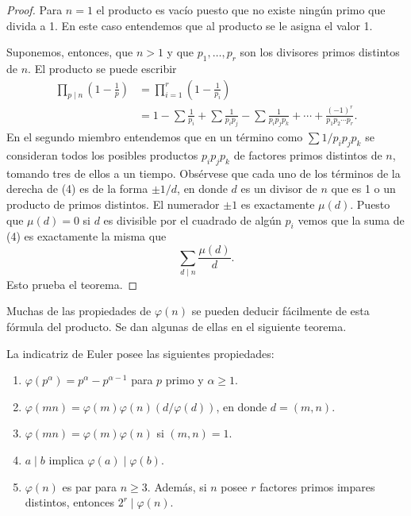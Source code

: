 \documentclass[12pt,a4paper]{book}
\begin{document}
    \begin{proof}
        Para $n=1$ el producto es vacío puesto que no existe ningún primo que divida a 1.
        En este caso entendemos que al producto se le asigna el valor 1.

        Suponemos, entonces, que $n>1$ y que $p_{1},\dots,p_{r}$ son los divisores primos
        distintos de $n$. El producto se puede escribir
        \begin{align}
            \prod_{p\mid n}\left(1-\frac{1}{p}\right)&=\prod_{i=1}^{r}\left(1-\frac{1}{p_{i}}\right)\\
            &=1-\sum\frac{1}{p_{i}}+\sum\frac{1}{p_{i}p_{j}}-\sum\frac{1}{p_{i}p_{j}p_{k}}+\cdots
            +\frac{(-1)^{r}}{p_{1}p_{2}\cdots p_{r}}.
        \end{align}
        En el segundo miembro entendemos que en un término como $\sum1/p_{i}p_{j}p_{k}$ se
        consideran todos los posibles productos $p_{i}p_{j}p_{k}$ de factores primos distintos de
        $n$, tomando tres de ellos a un tiempo. Obsérvese que cada uno de los términos de la
        derecha de (4) es de la forma $\pm1/d$, en donde $d$ es un divisor de $n$ que es 1 o
        un producto de primos distintos. El numerador $\pm1$ es exactamente $\mu(d)$. Puesto
        que $\mu(d)=0$ si $d$ es divisible por el cuadrado de algún $p_{i}$ vemos que la suma
        de (4) es exactamente la misma que
        \begin{equation*}
            \sum_{d\mid n}\frac{\mu(d)}{d}.
        \end{equation*}
        Esto prueba el teorema.
    \end{proof}

    Muchas de las propiedades de $\varphi(n)$ se pueden deducir fácilmente de esta fórmula
    del producto. Se dan algunas de ellas en el siguiente teorema.

    \begin{teorema}
        La indicatriz de Euler posee las siguientes propiedades:
        \begin{enumerate}
            \item[(a)] $\varphi(p^{\alpha})=p^{\alpha}-p^{\alpha-1}$ para $p$ primo y
            $\alpha\geq1$.
            \item[(b)] $\varphi(mn)=\varphi(m)\varphi(n)(d/\varphi(d))$, en donde $d=(m,n)$.
            \item[(c)] $\varphi(mn)=\varphi(m)\varphi(n)$ si $(m,n)=1$.
            \item[(d)] $a\mid b$ implica $\varphi(a)\mid\varphi(b)$.
            \item[(e)] $\varphi(n)$ es par para $n\geq3$. Además, si $n$ posee $r$ factores
            primos impares distintos, entonces $2^{r}\mid\varphi(n)$.
        \end{enumerate}
    \end{teorema}
\end{document}
